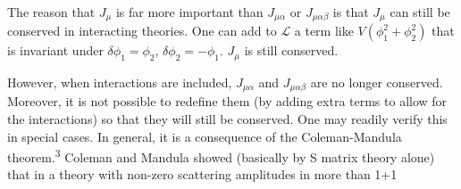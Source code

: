 \documentclass[11pt,a4paper]{article}
\begin{document}
The reason that $J_\mu$ is far more important than $J_{\mu\alpha}$ or
$J_{\mu\alpha\beta}$ is that $J_\mu$ can still be conserved in interacting
theories. One can add to $\mathcal{L}$ a term like $V(\phi_1^2 + \phi_2^2)$
that is invariant under $\delta \phi_1 = \phi_2$, $\delta \phi_2 = -\phi_1$.
$J_\mu$ is still conserved.

However, when interactions are included, $J_{\mu\alpha}$ and $J_{\mu\alpha\beta}$
are no longer conserved. Moreover, it is not possible to redefine them (by
adding extra terms to allow for the interactions) so that they will still be
conserved. One may readily verify this in special cases. In general, it is a
consequence of the Coleman-Mandula theorem.\textsuperscript{3} Coleman and
Mandula showed (basically by S matrix theory alone) that in a theory with
non-zero scattering amplitudes in more than 1+1


\end{document}
